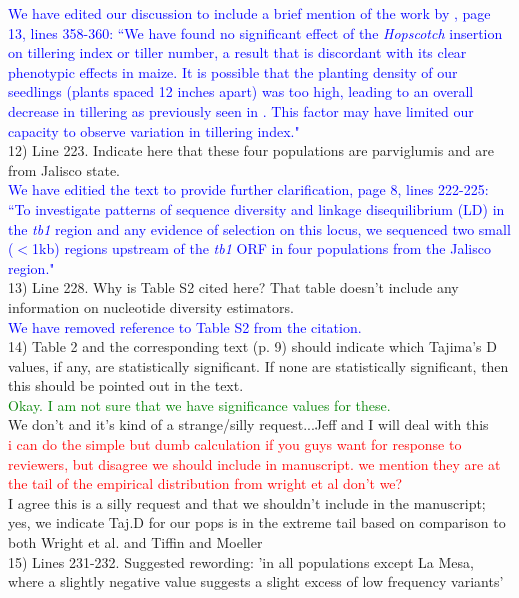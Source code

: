 \documentclass[11pt]{article}
\newcommand{\res}[1]{\noindent \textcolor{blue}{{#1}} \\}
\newcommand{\jri}[1]{\noindent \textcolor{red}{{#1}} \\}
\newcommand{\lev}[1]{\noindent \textcolor{green}{{#1}} \\}
\newcommand{\mbh}[1]{\noindent \textcolor{Dandelion}{{#1}}\\}
\begin{document}
\res{We have edited our discussion to include a brief mention of the work by \citet{LukensDoebley1999}, page 13, lines 358-360: ``We have found no significant effect of the \emph{Hopscotch} insertion on tillering index or tiller number, a result that is discordant with its clear phenotypic effects in maize. It is possible that the planting density of our seedlings (plants spaced 12 inches apart) was too high, leading to an overall decrease in tillering as previously seen in \citet{LukensDoebley1999}.  This factor may have limited our capacity to observe variation in tillering index."}

12) Line 223. Indicate here that these four populations are parviglumis and are from Jalisco state. \\

\res{We have editied the text to provide further clarification, page 8, lines 222-225: ``To investigate patterns of sequence diversity and linkage disequilibrium (LD) in the \emph{tb1} region and any evidence of selection on this locus, we sequenced two small ($<$1kb) regions upstream of the \emph{tb1} ORF in four populations from the Jalisco region."}

13) Line 228. Why is Table S2 cited here? That table doesn't include any information on nucleotide diversity estimators.\\

\res{We have removed reference to Table S2 from the citation.}

14) Table 2 and the corresponding text (p. 9) should indicate which Tajima's D values, if any, are statistically significant. If none are statistically significant, then this should be pointed out in the text. \\

\lev{Okay. I am not sure that we have significance values for these.}

\mbh{We don't and it's kind of a strange/silly request...Jeff and I will deal with this}
\jri{ i can do the simple but dumb calculation if you guys want for response to reviewers, but disagree we should include in manuscript. we mention they are at the tail of the empirical distribution from wright et al don't we?}
\mbh{I agree this is a silly request and that we shouldn't include in the manuscript; yes, we indicate Taj.D for our pops is in the extreme tail based on comparison to both Wright et al. and Tiffin and Moeller}

15) Lines 231-232. Suggested rewording: 'in all populations except La Mesa, where a slightly negative value suggests a slight excess of low frequency variants'\\
\end{document}
